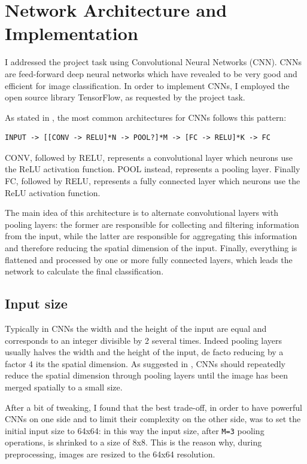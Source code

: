 \documentclass{article}
\begin{document}
\section{Network Architecture and Implementation}
\label{architecture}

I addressed the project task using Convolutional Neural Networks (CNN).
CNNs are feed-forward deep neural networks which have revealed to be very good and efficient for image classification.
In order to implement CNNs, I employed the open source library TensorFlow, as requested by the project task.

As stated in \cite{cnnStanford}, the most common architectures for CNNs follows this pattern:
\begin{verbatim}
INPUT -> [[CONV -> RELU]*N -> POOL?]*M -> [FC -> RELU]*K -> FC
\end{verbatim}
CONV, followed by RELU, represents a convolutional layer which neurons use the ReLU activation function.
POOL instead, represents a pooling layer.
Finally FC, followed by RELU, represents a fully connected layer which neurons use the ReLU activation function.

The main idea of this architecture is to alternate convolutional layers with pooling layers:
the former are responsible for collecting and filtering information from the input, while the latter are responsible for aggregating this information and therefore reducing the spatial dimension of the input.
Finally, everything is flattened and processed by one or more fully connected layers, which leads the network to calculate the final classification.

\subsection{Input size}
Typically in CNNs the width and the height of the input are equal and corresponds to an integer divisible by 2 several times.
Indeed pooling layers usually halves the width and the height of the input, de facto reducing by a factor 4 its the spatial dimension.
As suggested in \cite{cnnStanford}, CNNs should repeatedly reduce the spatial dimension through pooling layers until the image has been merged spatially to a small size.

After a bit of tweaking, I found that the best trade-off, in order to have powerful CNNs on one side and to limit their complexity on the other side, was to set the initial input size to 64x64: in this way the input size, after \texttt{M=3} pooling operations, is shrinked to a size of 8x8.
This is the reason why, during preprocessing, images are resized to the 64x64 resolution.
\end{document}
